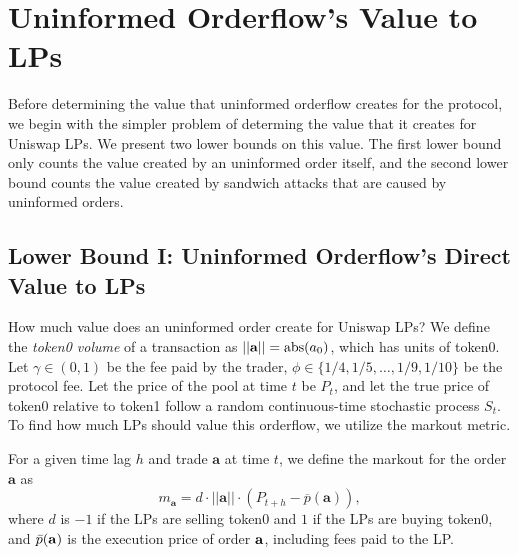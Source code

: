 \section{Uninformed Orderflow's Value to LPs} \label{section:lp-oflow-value}
Before determining the value that uninformed orderflow creates for the protocol, we begin with the simpler problem of determing the value that it creates for Uniswap LPs. We present two lower bounds on this value. The first lower bound only counts the value created by an uninformed order itself, and the second lower bound counts the value created by sandwich attacks that are caused by uninformed orders.
    
\subsection{Lower Bound I: Uninformed Orderflow's Direct Value to LPs}
    How much value does an uninformed order create for Uniswap LPs?
    We define the \textit{token0 volume} of a transaction as $||\textbf a|| = \text{abs}(a_0)$, which has units of token0. Let $\gamma \in (0,1)$ be the fee paid by the trader, $\phi \in \{1/4, 1/5, \dots, 1/9, 1/10 \}$ be the protocol fee. Let the price of the pool at time $t$ be $P_t$, and let the true price of token0 relative to token1 follow a random continuous-time stochastic process $S_t$. To find how much LPs should value this orderflow, we utilize the markout metric.

    \begin{definition}[$h$-Markout]
        For a given time lag $h$ and trade $\textbf{a}$ at time $t$, we define the markout for the order $\textbf{a}$ as 
        $$m_{\textbf{a}} = d \cdot ||\textbf{a}|| \cdot (P_{t + h} - \overline p(\textbf{a})),$$
        where $d$ is $-1$ if the LPs are selling token0 and $1$ if the LPs are buying token0, and $\bar p(\bf a)$ is the execution price of order $\bf a$, including fees paid to the LP.
    \end{definition}

